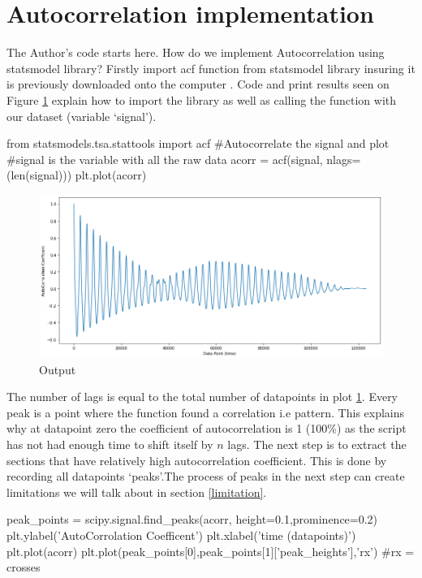  \raggedright
\section{Autocorrelation implementation}
The Author's code starts here. How do we implement Autocorrelation using statsmodel library?
Firstly import acf function from statsmodel library insuring it is previously downloaded onto the computer \cite{statsmodel}. Code and print results seen on Figure \ref{a} explain how to import the library as well as calling the function with our dataset (variable `signal'). 

\begin{python}
from statsmodels.tsa.stattools import acf
#Autocorrelate the signal and plot
#signal is the variable with all the raw data
acorr = acf(signal, nlags=(len(signal)))
plt.plot(acorr)
\end{python}

\begin{figure}[ht]
\includegraphics[scale=0.45]{images/autocorrolationCoefficent.png}
\caption{Output}
\label{a}
\end{figure}
The number of lags is equal to the total number of datapoints in plot \ref{a}.
Every peak is a point where the function found a correlation i.e pattern. This explains why at datapoint zero the coefficient of autocorrelation is 1 (100\%) as the script has not had enough time to shift itself by $n$ lags.
The next step is to extract the sections that have relatively high autocorrelation coefficient. This is done by recording all datapoints `peaks'.The process of peaks in the next step can create limitations we will talk about in section \ref{limitation}.


\begin{python}
peak_points = scipy.signal.find_peaks(acorr, height=0.1,prominence=0.2)
plt.ylabel('AutoCorrolation Coefficent')
plt.xlabel('time (datapoints)')
plt.plot(acorr)
plt.plot(peak_points[0],peak_points[1]['peak_heights'],'rx') 
#rx = crosses
\end{python}

